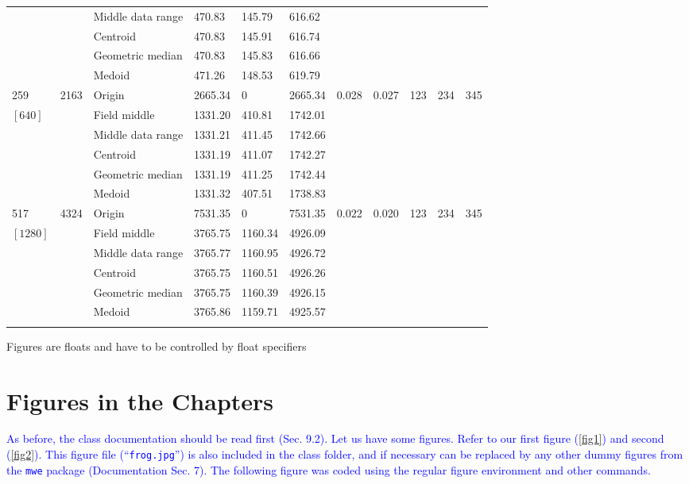 \documentclass[phd,showframe]{ndsu-thesis-2022}
\newcommand\italk[1]{\textcolor{blue}{#1}}  %
\begin{document}
\begin{landscape}
{{\begin{ThreePartTable}
\begin{longtable}{lll lll ll rrr}
 &  & Middle data range  & 470.83 & 145.79 & 616.62 \\
 &  & Centroid & 470.83 & 145.91 & 616.74 \\
 &  & Geometric median & 470.83 & 145.83 & 616.66 \\
 &  & Medoid  & 471.26 & 148.53 & 619.79 \\
\midrule
259 & 2163 & Origin  & 2665.34 & 0 & 2665.34 & 0.028 & 0.027 & 123 & 234 & 345 \\
$[640]$ &  & Field middle  & 1331.20 & 410.81 & 1742.01 \\
 &  & Middle data range  & 1331.21 & 411.45 & 1742.66 \\
 &  & Centroid & 1331.19 & 411.07 & 1742.27 \\
 &  & Geometric median & 1331.19 & 411.25 & 1742.44 \\
 &  & Medoid  & 1331.32 & 407.51 & 1738.83 \\
\midrule
517 & 4324 & Origin  & 7531.35 & 0 & 7531.35 & 0.022 & 0.020 & 123 & 234 & 345 \\
$[1280]$ &  & Field middle  & 3765.75 & 1160.34 & 4926.09 \\
 &  & Middle data range  & 3765.77 & 1160.95 & 4926.72 \\
 &  & Centroid & 3765.75 & 1160.51 & 4926.26 \\
 &  & Geometric median & 3765.75 & 1160.39 & 4926.15 \\
 &  & Medoid  & 3765.86 & 1159.71 & 4925.57 \\
\label{longtabls} %
\end{longtable} 
\end{ThreePartTable}
}
}
\end{landscape}

\setlength{\parindent}{0.5in}
\vspace{-2ex}


\kant[10-11]


{Figures are floats and have to be controlled by float specifiers}

\section{Figures in the Chapters}
\italk{As before, the class documentation should be read first (Sec. 9.2). Let us have some figures. Refer to our first figure (\cref{fig1}) and second (\cref{fig2}). This figure file (``\texttt{frog.jpg}'') is also included in the class folder, and if necessary can be replaced by any other dummy figures from the \texttt{mwe} package (Documentation Sec. 7). The following figure was coded using the regular figure environment and other commands.}
\end{document}

